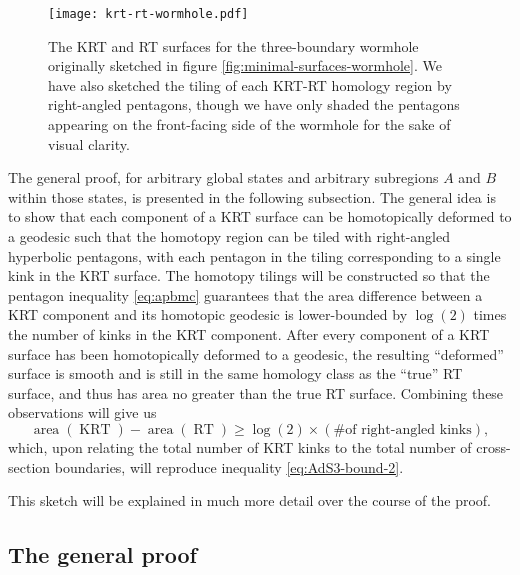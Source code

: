 \documentclass[a4paper,11pt]{article}
\newcommand{\area}{\operatorname{area}}
\newcommand{\RT}{\operatorname{RT}}
\newcommand{\KRT}{\operatorname{KRT}}
\begin{document}
\begin{figure}
    \centering
    \texttt{[image: krt-rt-wormhole.pdf]}
    \caption{The KRT and RT surfaces for the three-boundary wormhole originally sketched in figure \ref{fig:minimal-surfaces-wormhole}. We have also sketched the tiling of each KRT-RT homology region by right-angled pentagons, though we have only shaded the pentagons appearing on the front-facing side of the wormhole for the sake of visual clarity.} 
    \label{fig:krt-rt-wormhole}
\end{figure}


The general proof, for arbitrary global states and arbitrary subregions $A$ and $B$ within those states, is presented in the following subsection. The general idea is to show that each component of a KRT surface can be homotopically deformed to a geodesic such that the homotopy region can be tiled with right-angled hyperbolic pentagons, with each pentagon in the tiling corresponding to a single kink in the KRT surface. The homotopy tilings will be constructed so that the pentagon inequality \eqref{eq:apbmc} guarantees that the area difference between a KRT component and its homotopic geodesic is lower-bounded by $\log(2)$ times the number of kinks in the KRT component. After every component of a KRT surface has been homotopically deformed to a geodesic, the resulting ``deformed'' surface is smooth and is still in the same homology class as the ``true'' RT surface, and thus has area no greater than the true RT surface. Combining these observations will give us
\begin{equation}
    \area(\KRT) - \area(\RT) \geq \log(2) \times (\text{\# of right-angled kinks}),
\end{equation}
which, upon relating the total number of KRT kinks to the total number of cross-section boundaries, will reproduce inequality \eqref{eq:AdS3-bound-2}.

This sketch will be explained in much more detail over the course of the proof.

\subsection{The general proof}
\label{subsec:general-proof}
\end{document}
